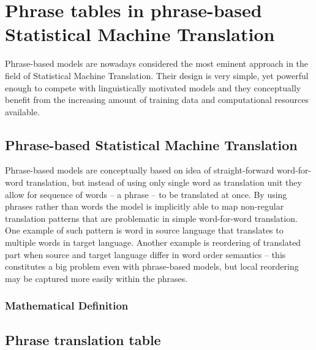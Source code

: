 
\chapter{Phrase tables in phrase-based Statistical Machine Translation}
\label{chap:phrase-based}


Phrase-based models are nowadays considered the most eminent approach in the field of Statistical Machine Translation.
Their design is very simple, yet powerful enough to compete with linguistically motivated models and
they conceptually benefit from the increasing amount of training data and computational resources available.

\section{Phrase-based Statistical Machine Translation}

Phrase-based models are conceptually based on idea of straight-forward word-for-word translation,
but instead of using only single word as translation unit they allow for sequence of words -- a phrase
-- to be translated at once.
By using phrases rather than words the model is implicitly able to map non-regular translation patterns
that are problematic in simple word-for-word translation.
One example of such pattern is word in source language that translates to multiple words in target language.
Another example is reordering of translated part when source and
target language differ in word order semantics
-- this constitutes a big problem even with phrase-based models,
but local reordering may be captured more easily within the phrases.

\subsection{Mathematical Definition}


\section{Phrase translation table}

